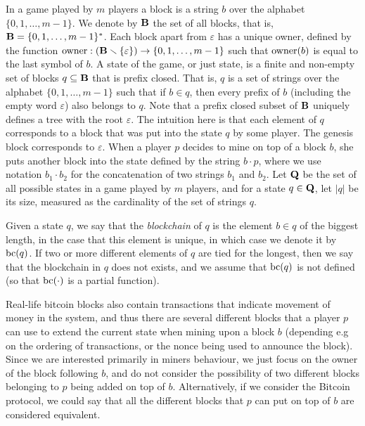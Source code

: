 In a game played by $m$ players a block is a string $b$ over the alphabet $\{0,1,\ldots, m-1\}$. We denote by $\mathbf{B}$ the set of all blocks, that is, $\mathbf{B} = \{0,1,\ldots , m-1\}^*$. Each block apart from $\varepsilon$ has a unique owner, defined by the function $\text{\rm owner}: (\mathbf{B} \smallsetminus \{\varepsilon\}) \rightarrow \{0,1, \ldots ,m-1\}$ such that $\text{\rm owner}(b)$ is equal to the last symbol of $b$. A state of the game, or just state,  is a finite and non-empty set of blocks $q \subseteq \mathbf{B}$ that is prefix closed. That is, $q$ is a set of strings over the alphabet $\{0,1,\ldots, m-1\}$ such that if $b\in q$, then every prefix of $b$ (including the empty word $\varepsilon$) also belongs to $q$. Note that a prefix closed subset of $\mathbf{B}$ uniquely defines a tree with the root $\varepsilon$. 
%
The intuition here is that each element of $q$ corresponds to a block that was put into the state $q$ by some player. The genesis block corresponds to $\varepsilon$. When a player $p$ decides to mine on top of a block $b$, she puts another block into the state defined by the string $b\cdot p$, where we use notation $b_1 \cdot b_2$ for the concatenation of two strings $b_1$ and $b_2$.
%
Let $\mathbf{Q}$ be the set of all possible states in a game played by $m$ players, and for a state $q \in \mathbf{Q}$, let $|q|$ be its size, measured as the cardinality of the set of strings $q$. 

Given a state $q$, we say that the {\em blockchain} of $q$ is the element $b\in q$ of the biggest length, in the case that this element is unique, in which case we denote it by $\text{bc}(q)$. If two or more different elements of $q$ are tied for the longest, then we say that the blockchain in $q$ does not exists, and we assume that $\text{bc}(q)$ is not defined (so that $\text{bc}(\cdot)$ is a partial function).

Real-life bitcoin blocks also contain transactions that indicate movement of money in the system, and thus there are 
several different blocks that a player $p$ can use to extend the current state when mining upon a block $b$ (depending e.g on the ordering of transactions, or the nonce being used to announce the block). Since we are interested primarily in miners behaviour, we just focus on the owner of the block following $b$, and do not consider the possibility of two different blocks belonging to $p$ being added on top of $b$. Alternatively, if we consider the Bitcoin protocol, we could say that all the different blocks that $p$ can put on top of $b$ are considered equivalent. 

